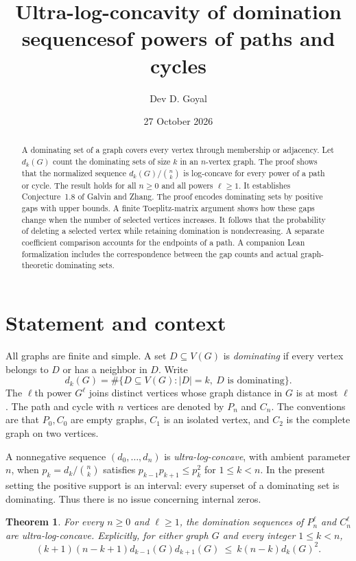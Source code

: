 \documentclass[11pt]{article}
\title{Ultra-log-concavity of domination sequences\newline of powers of paths and cycles}
\author{Dev D. Goyal}
\date{27 October 2026}
\newtheorem{theorem}{Theorem}[section]
\theoremstyle{definition}
\theoremstyle{remark}
\begin{document}
\maketitle

\begin{abstract}
A dominating set of a graph covers every vertex through membership or adjacency. Let $d_k(G)$ count the dominating sets of size $k$ in an $n$-vertex graph. The proof shows that the normalized sequence $d_k(G)/\binom nk$ is log-concave for every power of a path or cycle. The result holds for all $n\geq0$ and all powers $\ell\geq1$. It establishes Conjecture~1.8 of Galvin and Zhang. The proof encodes dominating sets by positive gaps with upper bounds. A finite Toeplitz-matrix argument shows how these gaps change when the number of selected vertices increases. It follows that the probability of deleting a selected vertex while retaining domination is nondecreasing. A separate coefficient comparison accounts for the endpoints of a path. A companion Lean formalization includes the correspondence between the gap counts and actual graph-theoretic dominating sets.
\end{abstract}

\section{Statement and context}

All graphs are finite and simple. A set $D\subseteq V(G)$ is
\emph{dominating} if every vertex belongs to $D$ or has a neighbor in $D$.
Write
\[
 d_k(G)=\#\{D\subseteq V(G): |D|=k,\ D\text{ is dominating}\}.
\]
The $\ell$th power $G^\ell$ joins distinct vertices whose graph distance in
$G$ is at most $\ell$. The path and cycle with $n$ vertices are denoted by
$P_n$ and $C_n$. The conventions are that $P_0,C_0$ are empty graphs,
$C_1$ is an isolated vertex, and $C_2$ is the complete graph on two vertices.

A nonnegative sequence $(d_0,\ldots,d_n)$ is \emph{ultra-log-concave}, with
ambient parameter $n$, when $p_k=d_k/\binom nk$ satisfies
$p_{k-1}p_{k+1}\leq p_k^2$ for $1\leq k<n$. In the present setting the
positive support is an interval: every superset of a dominating set is
dominating. Thus there is no issue concerning internal zeros.

\begin{theorem}\label{thm:main}
For every $n\geq0$ and $\ell\geq1$, the domination sequences of
$P_n^\ell$ and $C_n^\ell$ are ultra-log-concave. Explicitly, for either
graph $G$ and every integer $1\leq k<n$,
\begin{equation}\label{eq:main}
 (k+1)(n-k+1)d_{k-1}(G)d_{k+1}(G)
 \ \leq\ k(n-k)d_k(G)^2.
\end{equation}
\end{theorem}
\end{document}
